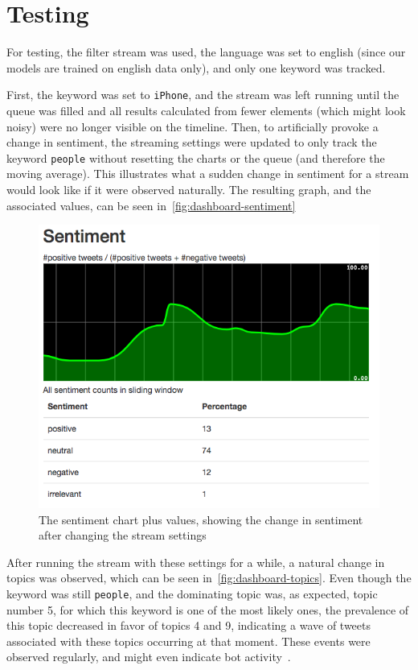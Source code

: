 \section{Testing}
\label{sec:testing}

For testing, the filter stream was used,
the language was set to english (since our models are trained on english data only),
and only one keyword was tracked.
\par
First, the keyword was set to \texttt{iPhone},
and the stream was left running until the queue was filled and all results calculated from fewer elements
(which might look noisy) were no longer visible on the timeline.
Then, to artificially provoke a change in sentiment,
the streaming settings were updated to only track the keyword \texttt{people} without resetting the charts or the queue (and therefore the moving average).
This illustrates what a sudden change in sentiment for a stream would look like if it were observed naturally.
The resulting graph, and the associated values, can be seen in~\autoref{fig:dashboard-sentiment}

\begin{figure}
    \centering
    \caption{The sentiment chart plus values, showing the change in sentiment after changing the stream settings}
    \label{fig:dashboard-sentiment}
    \includegraphics[width=\textwidth]{../images/dashboard_sentiment.png}
\end{figure}

\par
After running the stream with these settings for a while, a natural change in topics was observed, which can be seen in~\autoref{fig:dashboard-topics}.
Even though the keyword was still \texttt{people}, and the dominating topic was, as expected, topic number 5,
for which this keyword is one of the most likely ones, the prevalence of this topic decreased in favor of topics 4 and 9,
indicating a wave of tweets associated with these topics occurring at that moment.
These events were observed regularly, and might even indicate bot activity~\cite{chu2012detecting}.

